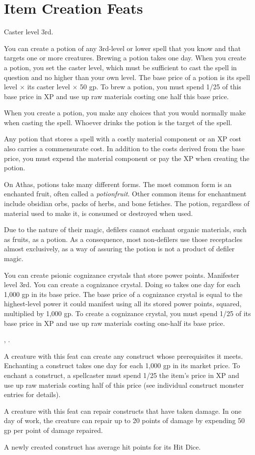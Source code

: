 \section{Item Creation Feats}

{}
{Caster level 3rd.}
{You can create a potion of any 3rd-level or lower spell that you know and that targets one or more creatures. Brewing a potion takes one day. When you create a potion, you set the caster level, which must be sufficient to cast the spell in question and no higher than your own level. The base price of a potion is its spell level $\times$ its caster level $\times$ 50 gp. To brew a potion, you must spend 1/25 of this base price in XP and use up raw materials costing one half this base price.

When you create a potion, you make any choices that you would normally make when casting the spell. Whoever drinks the potion is the target of the spell.

Any potion that stores a spell with a costly material component or an XP cost also carries a commensurate cost. In addition to the costs derived from the base price, you must expend the material component or pay the XP when creating the potion.}
{}
{On Athas, potions take many different forms. The most common form is an enchanted fruit, often called a \emph{potionfruit}. Other common items for enchantment include obsidian orbs, packs of herbs, and bone fetishes. The potion, regardless of material used to make it, is consumed or destroyed when used.

Due to the nature of their magic, defilers cannot enchant organic materials, such as fruits, as a potion. As a consequence, most non-defilers use those receptacles almost exclusively, as a way of assuring the potion is not a product of defiler magic.}

{You can create psionic cognizance crystals that store power points.}
{Manifester level 3rd.}
{You can create a cognizance crystal. Doing so takes one day for each 1,000 gp in its base price. The base price of a cognizance crystal is equal to the highest-level power it could manifest using all its stored power points, squared, multiplied by 1,000 gp. To create a cognizance crystal, you must spend 1/25 of its base price in XP and use up raw materials costing one-half its base price.}{}{}

{, .}
{A creature with this feat can create any construct whose prerequisites it meets. Enchanting a construct takes one day for each 1,000 gp in its market price. To enchant a construct, a spellcaster must spend 1/25 the item's price in XP and use up raw materials costing half of this price (see individual construct monster entries for details).

A creature with this feat can repair constructs that have taken damage. In one day of work, the creature can repair up to 20 points of damage by expending 50 gp per point of damage repaired.

A newly created construct has average hit points for its Hit Dice.}

